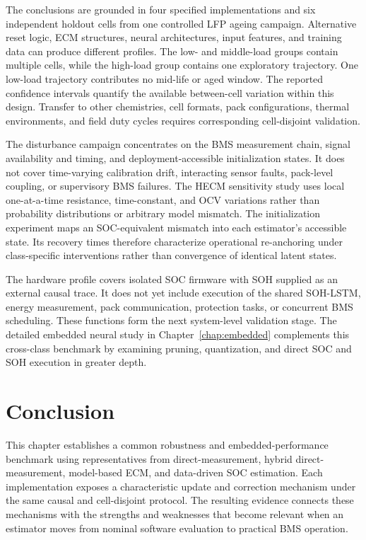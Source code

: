 The conclusions are grounded in four specified implementations and six independent holdout cells from one controlled LFP ageing campaign. Alternative reset logic, ECM structures, neural architectures, input features, and training data can produce different profiles. The low- and middle-load groups contain multiple cells, while the high-load group contains one exploratory trajectory. One low-load trajectory contributes no mid-life or aged window. The reported confidence intervals quantify the available between-cell variation within this design. Transfer to other chemistries, cell formats, pack configurations, thermal environments, and field duty cycles requires corresponding cell-disjoint validation.

The disturbance campaign concentrates on the BMS measurement chain, signal availability and timing, and deployment-accessible initialization states. It does not cover time-varying calibration drift, interacting sensor faults, pack-level coupling, or supervisory BMS failures. The HECM sensitivity study uses local one-at-a-time resistance, time-constant, and OCV variations rather than probability distributions or arbitrary model mismatch. The initialization experiment maps an SOC-equivalent mismatch into each estimator's accessible state. Its recovery times therefore characterize operational re-anchoring under class-specific interventions rather than convergence of identical latent states.

The hardware profile covers isolated SOC firmware with SOH supplied as an external causal trace. It does not yet include execution of the shared SOH-LSTM, energy measurement, pack communication, protection tasks, or concurrent BMS scheduling. These functions form the next system-level validation stage. The detailed embedded neural study in Chapter~\ref{chap:embedded} complements this cross-class benchmark by examining pruning, quantization, and direct SOC and SOH execution in greater depth.

\section{Conclusion}

This chapter establishes a common robustness and embedded-performance benchmark using representatives from direct-measurement, hybrid direct-measurement, model-based ECM, and data-driven SOC estimation. Each implementation exposes a characteristic update and correction mechanism under the same causal and cell-disjoint protocol. The resulting evidence connects these mechanisms with the strengths and weaknesses that become relevant when an estimator moves from nominal software evaluation to practical BMS operation.

